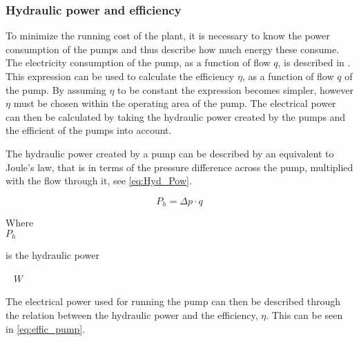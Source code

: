 \subsubsection*{Hydraulic power and efficiency}
To minimize the running cost of the plant, it is necessary to know the power consumption of the pumps and thus describe how much energy these consume. The electricity consumption of the pump, as a function of flow $q$, is described in \cite{master_aau}. This expression can be used to calculate the efficiency $\eta$, as a function of flow $q$ of the pump. By assuming $\eta$ to be constant the expression becomes simpler, however $\eta$ must be chosen within the operating area of the pump. The electrical power can then be calculated by taking the hydraulic power created by the pumps and the efficient of the pumps into account. 

The hydraulic power created by a pump can be described by an equivalent to Joule's law, that is in terms of the pressure difference across the pump, multiplied with the flow through it, see \eqref{eq:Hyd_Pow}.

\begin{equation}
P_h = \Delta p \cdot q 
\label{eq:Hyd_Pow}
\end{equation}

\begin{minipage}[t]{0.20\textwidth}
Where\\
\hspace*{8mm} $P_h$
\end{minipage}
\begin{minipage}[t]{0.68\textwidth}
\vspace*{2mm}
is the hydraulic power
\end{minipage}
\begin{minipage}[t]{0.10\textwidth}
\vspace*{2mm}
\textcolor{White}{te}$\unit{W}$\\
\end{minipage}	

The electrical power used for running the pump can then be described through the relation between the hydraulic power and the efficiency, $\eta$. This can be seen in \eqref{eq:effic_pump}.

